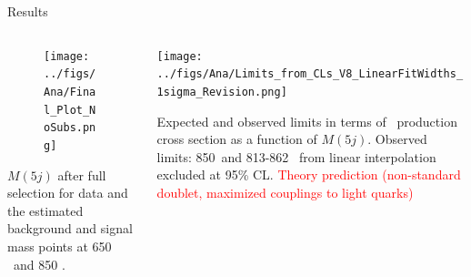 \begin{frame}{Results}
\vspace{-.6cm}

\begin{columns}
\begin{column}{.50\textwidth}\tiny
\begin{figure}[!Hhtbp]
  \begin{center}
    \texttt{[image: ../figs/Ana/Final\_Plot\_NoSubs.png]}
  \end{center}
\end{figure}
\vspace{-.2cm}
\begin{block}{}\tiny
$M(5j)$ after full selection for data and the estimated background and signal mass points at 650 \GeVcc~and 850 \GeVcc.
\end{block}
\end{column}

\begin{column}{.50\textwidth}\tiny
  \begin{center}
    \texttt{[image: ../figs/Ana/Limits\_from\_CLs\_V8\_LinearFitWidths\_1sigma\_Revision.png]}
  \end{center}
\vspace{-.2cm}
\begin{block}{}\tiny
Expected and observed limits in terms of \Tp~production cross section as a function of $M(5j)$. Observed limits: 850~\GeVcc and 813-862 \GeVcc~from linear interpolation excluded at 95\% CL. \textcolor{red}{Theory prediction (non-standard doublet, maximized couplings to light quarks)}
\end{block}
\end{column}

\end{columns}

\end{frame}




